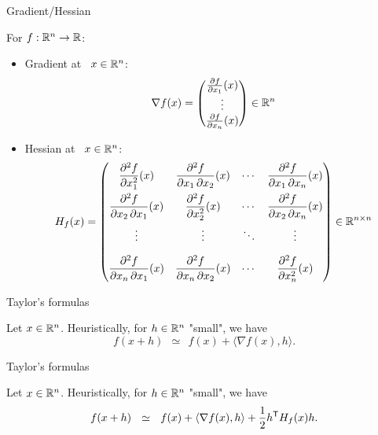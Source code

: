 \documentclass{beamer}
\begin{document}
\begin{frame}[t]{Gradient/Hessian}
	\grid 

	\vspace{-0.4cm}
	For $f: \mathbb{R}^n \to \mathbb{R}$:
	\vspace{0.2cm}
	\begin{itemize}
		\item Gradient at \ $x \in \mathbb{R}^n$:
			$$
			\nabla f(x) = 
			\begin{pmatrix}
				\frac{\partial f}{\partial x_1}(x) \\
				\vdots \\
				\frac{\partial f}{\partial x_n}(x)
			\end{pmatrix}
			\in \mathbb{R}^n
			$$
		\item Hessian at \ $x \in \mathbb{R}^n$:
			\vspace{0.4cm}
			{\small
				$$
				H_f(x) = 
				\begin{pmatrix}
					\dfrac {\partial ^{2}f}{\partial x_{1}^{2}}(x)&{\dfrac {\partial ^{2}f}{\partial x_{1}\,\partial x_{2}}}(x)&\cdots &{\dfrac {\partial ^{2}f}{\partial x_{1}\,\partial x_{n}}(x)}\\[2.2ex]{\dfrac {\partial ^{2}f}{\partial x_{2}\,\partial x_{1}}(x)}&{\dfrac {\partial ^{2}f}{\partial x_{2}^{2}}(x)}&\cdots &{\dfrac {\partial ^{2}f}{\partial x_{2}\,\partial x_{n}}(x)}\\[2.2ex]\vdots &\vdots &\ddots &\vdots \\[2.2ex]{\dfrac {\partial ^{2}f}{\partial x_{n}\,\partial x_{1}}(x)}&{\dfrac {\partial ^{2}f}{\partial x_{n}\,\partial x_{2}}(x)}&\cdots &{\dfrac {\partial ^{2}f}{\partial x_{n}^{2}}(x)}
				\end{pmatrix}
				\in \mathbb{R}^{n \times n}
				$$
			}
	\end{itemize}

\end{frame}

\begin{frame}[t]{Taylor's formulas}
	\grid

	Let $x \in \mathbb{R}^n$. Heuristically, for $h \in \mathbb{R}^n$ "small", we have
	$$
	f(x+h) \ \ \simeq  \ \ f(x) + \langle \nabla f(x), h \rangle.
	$$
\end{frame}
\begin{frame}[t]{Taylor's formulas}
	\grid

	Let $x \in \mathbb{R}^n$. Heuristically, for $h \in \mathbb{R}^n$ "small", we have
	$$
	f(x+h) \ \ \simeq  \ \ f(x) + \langle \nabla f(x), h \rangle + \frac{1}{2} h^{{\sf T}} H_f(x) h.
	$$
\end{frame}
\end{document}
